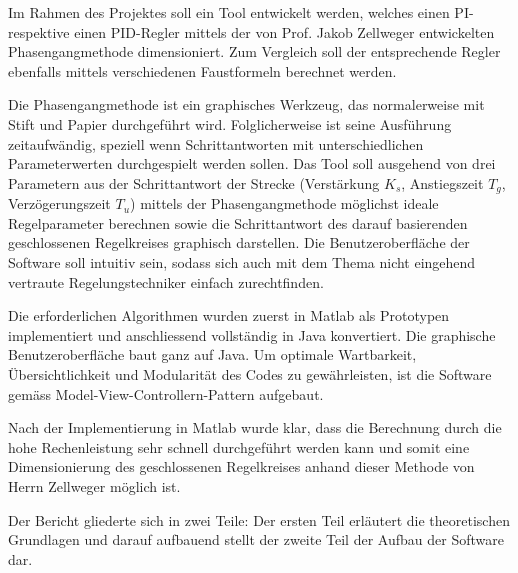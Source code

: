 Im Rahmen des Projektes soll ein  Tool entwickelt werden, welches einen PI-  
respektive einen PID-Regler mittels der von Prof. Jakob Zellweger entwickelten
Phasengangmethode                                                               
dimensioniert. Zum Vergleich  soll der entsprechende Regler  ebenfalls mittels
verschiedenen  Faustformeln berechnet  werden. 

Die  Phasengangmethode ist  ein
graphisches Werkzeug,  das normalerweise  mit Stift und  Papier durchgef\"uhrt
wird. Folglicherweise  ist seine  Ausf\"uhrung zeitaufw\"andig,  speziell wenn
Schrittantworten mit unterschiedlichen  Parameterwerten  durchgespielt
werden sollen. Das Tool soll ausgehend von drei Parametern aus der Schrittantwort der Strecke 
(Verst\"arkung  $K_s$, Anstiegszeit  $T_g$, Verz\"ogerungszeit  $T_u$) mittels
der Phasengangmethode  m\"oglichst ideale  Regelparameter berechnen  sowie die
Schrittantwort  des darauf  basierenden  geschlossenen Regelkreises  graphisch
darstellen. Die Benutzeroberfl\"ache  der Software soll intuitiv  sein, sodass
sich auch mit  dem Thema nicht eingehend  vertraute Regelungstechniker einfach
zurechtfinden.

Die  erforderlichen   Algorithmen  wurden   zuerst   in  Matlab 
als  Prototypen   implementiert  und   anschliessend  vollst\"andig   in  Java
konvertiert. Die  graphische Benutzeroberfl\"ache baut ganz  auf Java. Um
optimale  Wartbarkeit,  \"Ubersichtlichkeit  und Modularit\"at  des  Codes  zu
gew\"ahrleisten,  ist  die  Software  gem\"ass  Model-View-Controllern-Pattern
aufgebaut.

Nach  der Implementierung in  Matlab  wurde klar,  dass  die  Berechnung durch  die
hohe Rechenleistung  sehr schnell  durchgef\"uhrt werden  kann und  somit eine
Dimensionierung des geschlossenen Regelkreises anhand dieser Methode von Herrn
Zellweger m\"oglich ist.

Der  Bericht gliederte  sich  in  zwei Teile: Der ersten  Teil erläutert
 die  theoretischen  Grundlagen und  darauf  aufbauend stellt
der zweite  Teil   der Aufbau  der  Software dar.
